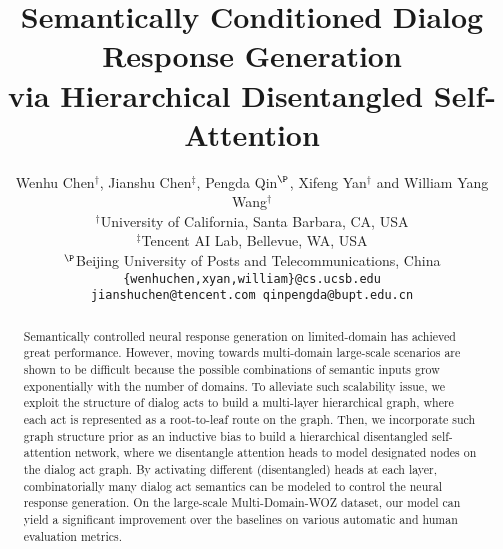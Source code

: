 \documentclass[11pt,a4paper]{article}
\title{Semantically Conditioned Dialog Response Generation \\ via Hierarchical Disentangled Self-Attention}
\author{Wenhu Chen$^\dagger$, Jianshu Chen$^\ddag$, Pengda Qin$^\P$, Xifeng Yan$^\dagger$ and William Yang Wang$^\dagger$ \\
$^\dagger$University of California, Santa Barbara, CA, USA\\
$^\ddag$Tencent AI Lab, Bellevue, WA, USA\\
$^\P$Beijing University of Posts and Telecommunications, China\\
{\tt \{wenhuchen,xyan,william\}@cs.ucsb.edu}\\
{\tt jianshuchen@tencent.com qinpengda@bupt.edu.cn}
}
\date{}
\begin{document}
\maketitle
\begin{abstract}
Semantically controlled neural response generation on limited-domain has achieved great performance. However, moving towards multi-domain large-scale scenarios are shown to be difficult because the possible combinations of semantic inputs grow exponentially with the number of domains. To alleviate such scalability issue, we exploit the structure of dialog acts to build a multi-layer hierarchical graph, where each act is represented as a root-to-leaf route on the graph. Then, we incorporate such graph structure prior as an inductive bias to build a hierarchical disentangled self-attention network, where we disentangle attention heads to model designated nodes on the dialog act graph. By activating different (disentangled) heads at each layer, combinatorially many dialog act semantics can be modeled to control the neural response generation. On the large-scale Multi-Domain-WOZ dataset, our model can yield a significant improvement over the baselines on various automatic and human evaluation metrics.
\end{abstract}
\end{document}
